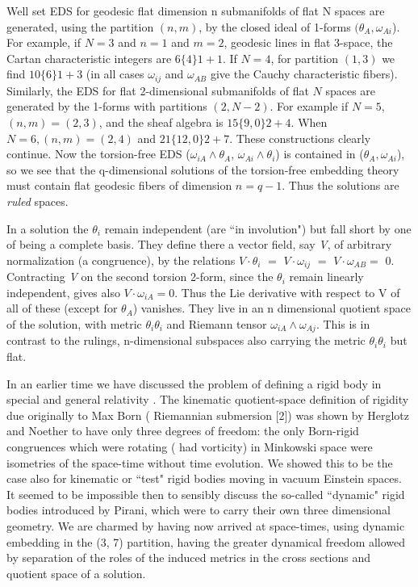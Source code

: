 \documentclass[a4paper,a4paper]{article}
\begin{document}
   Well set EDS for geodesic flat dimension n submanifolds of flat
N spaces are generated,  using the partition $(n, m)$,  by the closed ideal
of 1-forms $({{\theta }_{A }}, {{\omega }_{{Ai}}}$).
For example,  if $N = 3$ and $n = 1$ and $m = 2$,   geodesic lines in
flat 3-space,  the Cartan characteristic integers are
$6\{4\}1 +1$.  If $N = 4$,  for partition $(1, 3)$ we find $10\{6\}1 +
3$ (in all cases ${{\omega }_{{ij}}}$ and
${\omega }_{{AB}}$
give the Cauchy characteristic fibers).  Similarly,  the EDS for flat
2-dimensional submanifolds of flat $N$ spaces are generated by the 1-forms 
with partitions $(2, N-2)$.  For example if $N =  5$, $(n, m) = (2, 3)$,  and  the sheaf
algebra is $15\{9, 0\}2 + 4$. When $N = 6,  (n, m) = (2, 4)$ and $21\{12, 0\}2 + 7$.  These
constructions clearly continue.  Now the torsion-free EDS
(${{\omega }_{{iA}}}\wedge {{\theta }_A}$,  ${{\omega }_{{Ai}}}\wedge
{{\theta }_i}$) is contained in (${{\theta }_{A }}, {{\omega
}_{{Ai}}}$), so we see that the q-dimensional solutions of the torsion-free
embedding theory must contain flat geodesic fibers of dimension $n = q-1$.  Thus 
the solutions are {\itshape ruled }spaces.

        In a solution the \({{\theta }_{i }}\) remain independent (are
``in involution") but fall short by one of being a complete basis.  They
define there a vector  field,  say {\itshape V},  of arbitrary normalization (a
congruence),  by the relations   \(V\cdot  {{\theta }_i}\){\itshape
 } \(=\)  \(V\cdot  {{\omega }_{{ij}}}\) \(=\) {\itshape  }\(V\cdot
{{\omega }_{{AB}}}\)\( \)\(=\)  0.
 Contracting {\itshape V} on the second torsion 2-form,  since the 
${{\theta }_i}$ remain linearly independent,  gives also $V\cdot
{\omega }_{iA}= 0$.  Thus the Lie derivative with respect to V of all of
these (except for \({{\theta }_A}\)) vanishes.  They live in an
n dimensional quotient space of the solution,  with metric \({{\theta
}_i}{{\theta }_i} \) and Riemann tensor \({{\omega }_{{iA}}}\wedge
{{\omega }_{{Aj}}} \).  This is in contrast to the rulings,
n-dimensional subspaces also carrying the metric  \({{\theta
}_i}{{\theta }_i}\) but flat.

        In an earlier time we have discussed the problem of defining a
rigid body in special and general relativity \cite{wah66}.  The
kinematic quotient-space definition of rigidity due originally to Max Born (
Riemannian submersion [2]) was shown by Herglotz and Noether to have only 
three degrees  of freedom: the only Born-rigid congruences which were rotating (
had vorticity) in Minkowski space were isometries of the space-time without time
evolution.  We showed this to be the case also for kinematic or ``test" rigid bodies
moving in vacuum Einstein spaces.   It seemed to be impossible then to
sensibly discuss the so-called ``dynamic" rigid bodies introduced by Pirani,  which
were to carry their own three dimensional geometry. We are charmed by having
now arrived at  space-times,  using dynamic embedding in the (3, 7) partition,
having the greater dynamical freedom allowed by separation of the roles
of the induced metrics in the cross sections and quotient space of a solution.
\end{document}
